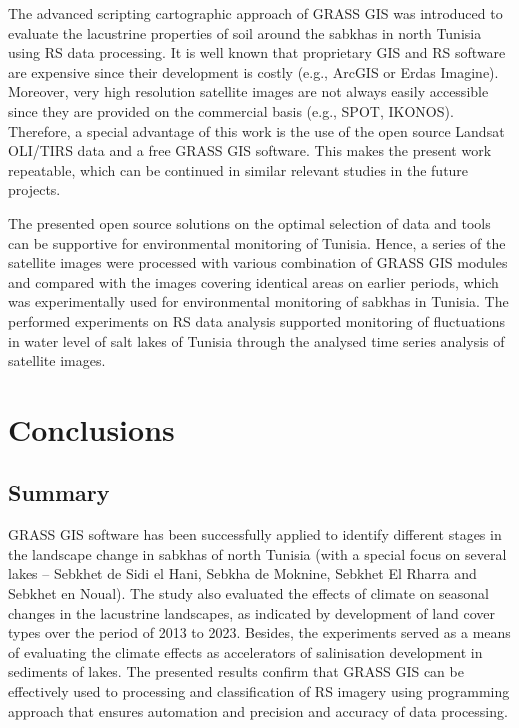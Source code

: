 \documentclass[environments,article,submit,pdftex,moreauthors]{Definitions/mdpi}
\begin{document}
The advanced scripting cartographic approach of GRASS GIS was introduced to evaluate the lacustrine properties of soil around the sabkhas in north Tunisia using RS data processing. It is well known that proprietary GIS and RS software are expensive since their development is costly (e.g., ArcGIS or Erdas Imagine). Moreover, very high resolution satellite images are not always easily accessible since they are provided on the commercial basis (e.g., SPOT, IKONOS). Therefore, a special advantage of this work is the use of the open source Landsat OLI/TIRS data and a free GRASS GIS software. This makes the present work repeatable, which can be continued in similar relevant studies in the future projects. 

The presented open source solutions on the optimal selection of data and tools can be supportive for environmental monitoring  of Tunisia. Hence, a series of the satellite images were processed with various combination of GRASS GIS modules and compared with the images covering identical areas on earlier periods, which was experimentally used for environmental monitoring of sabkhas in Tunisia. The performed experiments on RS data analysis supported monitoring of fluctuations in water level of salt lakes of Tunisia through the analysed time series analysis of satellite images. 

\section{Conclusions}

\subsection{Summary}

GRASS GIS software has been successfully applied to identify different stages in the landscape change in sabkhas of north Tunisia (with a special focus on several lakes -- Sebkhet de Sidi el Hani, Sebkha de Moknine, Sebkhet El Rharra and Sebkhet en Noual). The study also evaluated the effects of climate on seasonal changes in the lacustrine landscapes, as indicated by development of land cover types over the period of 2013 to 2023. Besides, the experiments served as a means of evaluating the climate effects as accelerators of salinisation development in sediments of lakes. The presented results confirm that GRASS GIS can be effectively used to processing and classification of RS imagery using programming approach that ensures automation and precision and accuracy of data processing. 
\end{document}

